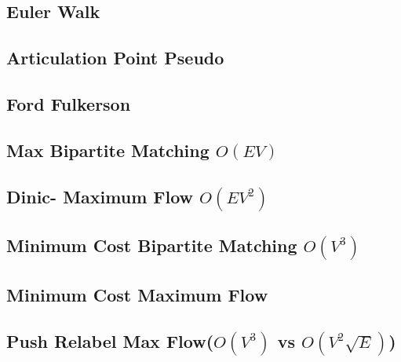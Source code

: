 \documentclass[12pt]{extarticle}
\begin{document}
\begin{multicols*}{2}
\subsection{Euler Walk} %


\subsection{Articulation Point Pseudo} %


% 

\subsection{Ford Fulkerson} %


\subsection{Max Bipartite Matching $O(EV)$} %



\subsection{Dinic- Maximum Flow $O(EV^2)$ } %


\subsection{Minimum Cost Bipartite Matching $O(V^3)$ } %


\subsection{Minimum Cost Maximum Flow } %


\subsection{Push Relabel Max Flow($O(V^3)$ vs $O(V^2\sqrt{E})$)}



\end{multicols*}
\end{document}

